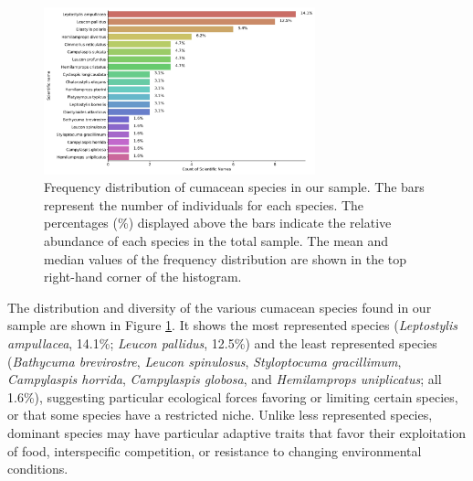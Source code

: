\begin{figure}[htbp]
    \centering
    \includegraphics[width=0.7\textwidth]{figure2.jpg}
    \caption{Frequency distribution of cumacean species in our sample. The bars represent the number of individuals for each species. The percentages (\%) displayed above the bars indicate the relative abundance of each species in the total sample. The mean and median values of the frequency distribution are shown in the top right-hand corner of the histogram. \label{fig:fig3}}
\end{figure}

The distribution and diversity of the various cumacean species found in our sample are shown in Figure \ref{fig:fig3}. It shows the most represented species (\emph{Leptostylis ampullacea}, 14.1\%; \emph{Leucon pallidus}, 12.5\%) and the least represented species (\emph{Bathycuma brevirostre}, \emph{Leucon spinulosus}, \emph{Styloptocuma gracillimum}, \emph{Campylaspis horrida}, \emph{Campylaspis globosa}, and \emph{Hemilamprops uniplicatus}; all 1.6\%), suggesting particular ecological forces favoring or limiting certain species, or that some species have a restricted niche. Unlike less represented species, dominant species may have particular adaptive traits that favor their exploitation of food, interspecific competition, or resistance to changing environmental conditions.

